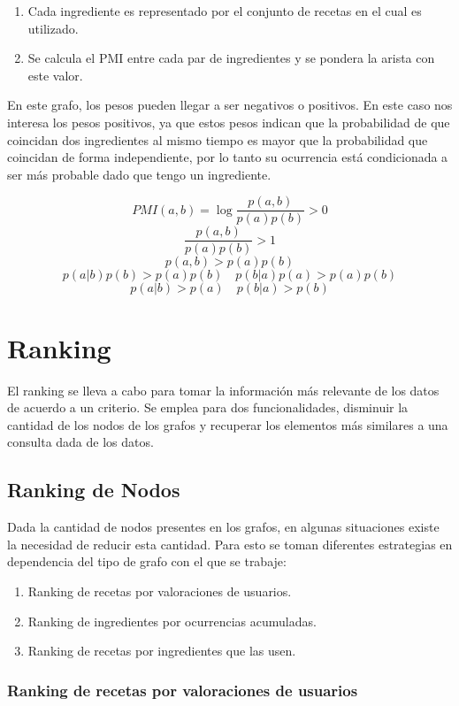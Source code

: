 \documentclass[
	a4paper, %
	10pt, %
	unnumberedsections, %
	twoside, %
]{LTJournalArticle}
\begin{document}
\begin{enumerate}
	\item Cada ingrediente es representado por el conjunto de recetas en el cual es utilizado.
	\item Se calcula el PMI entre cada par de ingredientes y se pondera la arista con este valor.
\end{enumerate}

En este grafo, los pesos pueden llegar a ser negativos o positivos. En este caso nos interesa los pesos positivos,
ya que estos pesos indican que la probabilidad de que coincidan dos ingredientes al mismo tiempo es mayor que la
probabilidad que coincidan de forma independiente, por lo tanto su ocurrencia está condicionada a ser más probable
dado que tengo un ingrediente.

$$
PMI(a,b) = \log \frac{p(a,b)}{p(a)p(b)} > 0
$$
$$
\frac{p(a,b)}{p(a)p(b)} > 1
$$
$$
p(a,b) > p(a)p(b)
$$
$$
p(a|b)p(b) > p(a)p(b) \quad p(b|a)p(a) > p(a)p(b)
$$
$$
p(a|b) > p(a) \quad p(b|a) > p(b)
$$

\section{Ranking}

El ranking se lleva a cabo para tomar la información más relevante de los datos de acuerdo a un criterio.
Se emplea para dos funcionalidades, disminuir la cantidad de los nodos de los grafos y recuperar los elementos
más similares a una consulta dada de los datos.
	
\subsection{Ranking de Nodos}

Dada la cantidad de nodos presentes en los grafos, en algunas situaciones existe la necesidad de reducir esta
cantidad. Para esto se toman diferentes estrategias en dependencia del tipo de grafo con el que se trabaje:

\begin{enumerate}
	\item Ranking de recetas por valoraciones de usuarios.
	\item Ranking de ingredientes por ocurrencias acumuladas.
	\item Ranking de recetas por ingredientes que las usen.
\end{enumerate}

\subsubsection{Ranking de recetas por valoraciones de usuarios}
\end{document}
